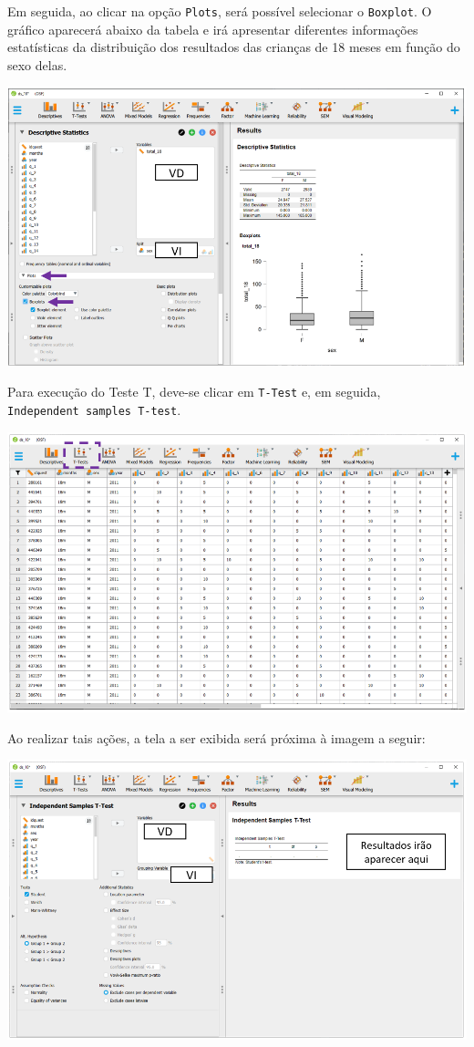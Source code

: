 \documentclass[
]{book}
\begin{document}
Em seguida, ao clicar na opção \texttt{Plots}, será possível selecionar o \texttt{Boxplot}. O gráfico aparecerá abaixo da tabela e irá apresentar diferentes informações estatísticas da distribuição dos resultados das crianças de 18 meses em função do sexo delas.

\includegraphics{./img/cap_testet_tabela.png}

Para execução do Teste T, deve-se clicar em \texttt{T-Test} e, em seguida, \texttt{Independent\ samples\ T-test}.

\includegraphics{./img/cap_testet_interface1.png}

Ao realizar tais ações, a tela a ser exibida será próxima à imagem a seguir:

\includegraphics{./img/cap_testet_interface.png}
\end{document}
